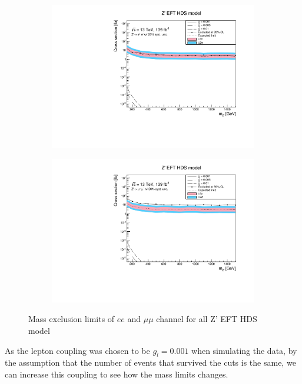 \documentclass[12pt, a4paper]{book}
\begin{document}
\begin{figure}[!ht]
	\centering
   \begin{subfigure}[b]{0.49\textwidth}
      \centering
      \includegraphics[width=1\textwidth]{Limits/EFT_HDS/mass_exclusion_ee.pdf}
      \end{subfigure}
   \hfill
   \begin{subfigure}[b]{0.49\textwidth}
      \centering
      \includegraphics[width=1\textwidth]{Limits/EFT_HDS/mass_exclusion_uu.pdf}
      \end{subfigure}
   \caption{Mass exclusion limits of $ee$ and $\mu\mu$ channel for all Z' EFT HDS model}\label{fig:EFT_HDS_exclusion_ee_uu}
\end{figure}
As the lepton coupling was chosen to be $g_l=0.001$ when simulating the data, by the assumption that the number of events that survived the cuts is the same, we can increase this coupling to see how the mass limits changes.
\end{document}
